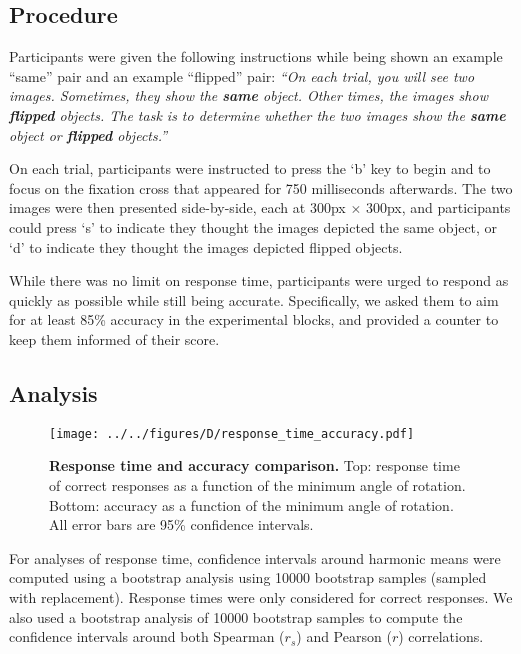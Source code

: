 \documentclass[10pt,letterpaper]{article}
\begin{document}
\subsection{Procedure}

Participants were given the following instructions while being shown
an example ``same'' pair and an example ``flipped'' pair: \textit{``On
  each trial, you will see two images. Sometimes, they show the
  \textbf{same} object. Other times, the images show \textbf{flipped}
  objects. The task is to determine whether the two images show the
  \textbf{same} object or \textbf{flipped} objects.''}

On each trial, participants were instructed to press the `b' key to
begin and to focus on the fixation cross that appeared for 750
milliseconds afterwards. The two images were then presented
side-by-side, each at 300px $\times$ 300px, and participants could
press `s' to indicate they thought the images depicted the same
object, or `d' to indicate they thought the images depicted flipped
objects.

While there was no limit on response time, participants were urged to
respond as quickly as possible while still being
accurate. Specifically, we asked them to aim for at least 85\%
accuracy in the experimental blocks, and provided a counter to keep
them informed of their score.

\subsection{Analysis}

\begin{figure*}[t]
  \begin{center}
    \texttt{[image: ../../figures/D/response\_time\_accuracy.pdf]}
    \caption{\textbf{Response time and accuracy comparison.} Top:
      response time of correct responses as a function of the minimum
      angle of rotation. Bottom: accuracy as a function of the minimum
      angle of rotation. All error bars are 95\% confidence
      intervals.}
    \label{fig:response-time-accuracy}
  \end{center}
\end{figure*}

For analyses of response time, confidence intervals around harmonic
means were computed using a bootstrap analysis using 10000 bootstrap
samples (sampled with replacement). Response times were only
considered for correct responses.  We also used a bootstrap analysis
of 10000 bootstrap samples to compute the confidence intervals around
both Spearman ($r_s$) and Pearson ($r$) correlations.
\end{document}
